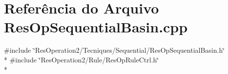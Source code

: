 \section{Referência do Arquivo Res\+Op\+Sequential\+Basin.\+cpp}
\label{_res_op_sequential_basin_8cpp}
{\ttfamily \#include \char`\"{}Res\+Operation2/\+Tecniques/\+Sequential/\+Res\+Op\+Sequential\+Basin.\+h\char`\"{}}\\*
{\ttfamily \#include \char`\"{}Res\+Operation2/\+Rule/\+Res\+Op\+Rule\+Ctrl.\+h\char`\"{}}\\*
